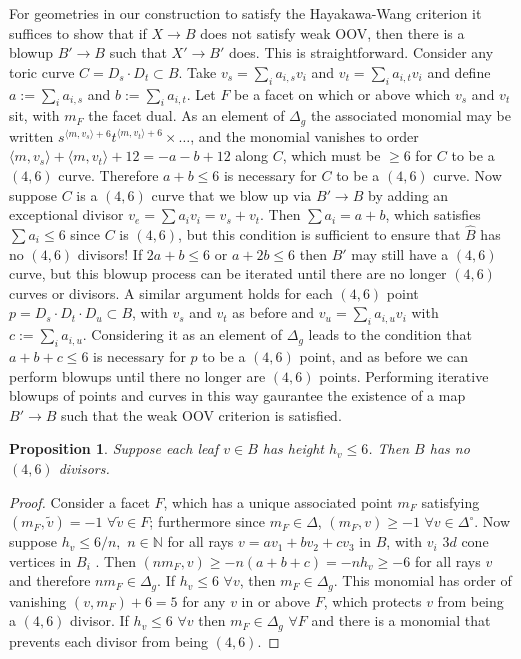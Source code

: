 \documentclass[aps,prl,twocolumn, superscriptaddress,groupedaddress,nofootinbib]{revtex4-1}
\newtheorem{prop}{Proposition}
\newcommand{\vev}[1]{\langle #1 \rangle}
\begin{document}
For geometries in our construction to satisfy the Hayakawa-Wang criterion it
suffices to show that if $X\to B$ does not satisfy weak OOV, then there is a
blowup $B'\to B$ such that $X'\to B'$ does. This is straightforward.
Consider any toric curve $C=D_s\cdot D_t \subset B$. Take $v_s=\sum_i a_{i,s} v_i$ and $v_t=\sum_i a_{i,t} v_i$ and define $a:=\sum_i a_{i,s}$ and $b:=\sum_i a_{i,t}$. Let $F$ be a facet
on which or above which $v_s$ and $v_t$ sit, with $m_F$ the facet dual. As an
element of $\Delta_g$ the associated monomial may be written
$s^{\vev{m,v_s}+6}t^{\vev{m,v_t}+6}\times \dots$,
and the monomial vanishes to order $\vev{m,v_s}+\vev{m,v_t}+12=-a-b+12$ along $C$,
which must be $\geq 6$ for $C$ to be a $(4,6)$ curve. Therefore $a+b\leq 6$ is necessary for
$C$ to be a $(4,6)$ curve.
Now suppose $C$ is a $(4,6)$ curve that we blow up via $B'\to B$ by
adding an exceptional divisor $v_e = \sum a_i v_i = v_s + v_t$. Then $\sum a_i=a+b$,
which satisfies $\sum a_i\leq 6$ since $C$ is $(4,6)$, but this condition is sufficient to ensure that $\hat B$ has no $(4,6)$ divisors! If $2a+b\leq 6$
or $a+2b\leq 6$ then $B'$ may still have a $(4,6)$ curve, but
this blowup process can be iterated until there are no longer
$(4,6)$ curves or divisors.  A similar argument
holds for each $(4,6)$ point $p=D_s\cdot D_t \cdot D_u \subset  B$, with $v_s$
and $v_t$ as before and $v_u=\sum_i a_{i,u} v_i$ with 
$c:=\sum_i a_{i,u}$. 
Considering
it as an element of $\Delta_g$ leads to the condition that $a+b+c\leq 6$
is necessary for $p$ to be a $(4,6)$ point, and as before we can perform blowups
until there no longer are $(4,6)$ points. Performing iterative blowups of points
and curves in this way gaurantee the existence of a map $B'\to B$ such that the
weak OOV criterion is satisfied.

\begin{prop}
\label{prop:heightcrit}
Suppose each leaf $v\in B$ has height $h_v\leq 6$. Then $B$ has
no $(4,6)$ divisors.
\end{prop}

\begin{proof}
Consider a facet
$F$, which has a unique associated point $m_F$ satisfying
$(m_F,\tilde v)=-1 \,\, \forall \tilde v \in F$; furthermore
since $m_F\in\Delta$, 
$(m_F,v)\geq -1\,\, \forall v\in\Delta^\circ$. Now
suppose $h_v \leq 6/n, \,\, n \in \mathbb{N}$  
for all rays $v=av_1 + b v_2 + c v_3$
in $B$, with $v_i$ $3d$ cone vertices in $B_i$ . Then 
$(nm_F, v)\geq -n(a+b+c)=-nh_v\geq -6$ for all rays $v$ and
therefore $nm_F \in \Delta_g.$ If $h_v\leq 6\,\, \forall v$,
then $m_F\in\Delta_g$. This monomial has order of vanishing
$(v,m_F)+6=5$ for any $v$ in or above $F$, which protects
$v$ from being a $(4,6)$ divisor. If
$h_v\leq 6 \,\, \forall v$ then $m_F \in \Delta_g\,\, \forall F$
and there is a monomial that prevents
each divisor from being $(4,6)$.
\end{proof}
\end{document}

